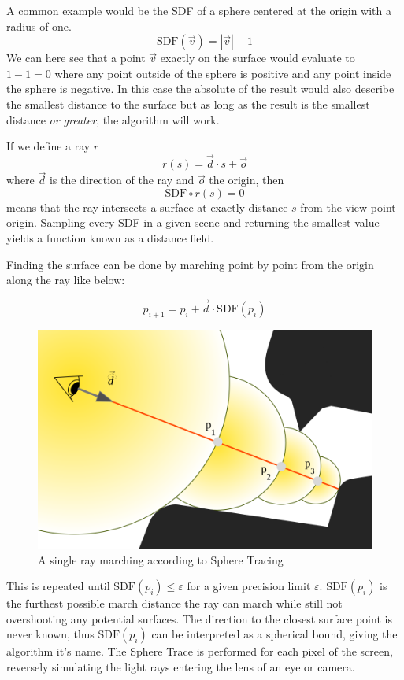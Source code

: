 		A common example would be the SDF of a sphere centered at the origin
		with a radius of one. $$\text{SDF}(\vec{v}) = |\vec{v}| - 1$$ We can
		here see that a point $\vec{v}$ exactly on the surface would evaluate
		to $1 - 1 = 0$ where any point outside of the sphere is positive and
		any point inside the sphere is negative. In this case the absolute of
		the result would also describe the smallest distance to the surface but
		as long as the result is the smallest distance \emph{or greater}, the
		algorithm will work.

		If we define a ray $r$ $$r(s) = \vec{d} \cdot s + \vec{o}$$ where
		$\vec{d}$ is the direction of the ray and $\vec{o}$ the origin, then
		$$\text{SDF}\circ r(s) = 0$$ means that the ray intersects a surface at
		exactly distance $s$ from the view point origin. Sampling every SDF in
		a given scene and returning the smallest value yields a function known
		as a distance field.

		\bigskip \noindent Finding the surface can be done by marching point by
		point from the origin along the ray like below: 
		
		$$p_{i+1} = p_i + \vec{d}\cdot \text{SDF}(p_i)$$ 
		
		\begin{figure}
			\centering
			\includegraphics[width=0.75\linewidth]{figure/SDF2}
			\caption{A single ray marching according to Sphere Tracing}
		\end{figure}

		This is repeated until $\text{SDF}(p_i) \leq \varepsilon$ for a given
		precision limit $\varepsilon$. $\text{SDF}(p_i)$ is the furthest
		possible march distance the ray can march while still not overshooting
		any potential surfaces. The direction to the closest surface point is
		never known, thus $\text{SDF}(p_i)$ can be interpreted as a spherical
		bound, giving the algorithm it's name. The Sphere Trace is performed
		for each pixel of the screen, reversely simulating the light rays
		entering the lens of an eye or camera.
		
